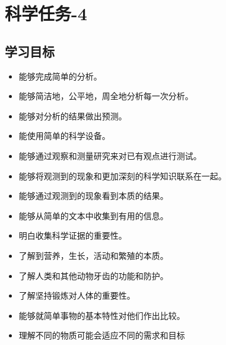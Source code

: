 \chapter{科学任务-4}


\section{学习目标}
    \begin{itemize}
      \item 能够完成简单的分析。
      \item 能够简洁地，公平地，周全地分析每一次分析。 
      \item 能够对分析的结果做出预测。
      \item 能使用简单的科学设备。
      \item 能够通过观察和测量研究来对已有观点进行测试。
      \item 能够将观测到的现象和更加深刻的科学知识联系在一起。
      \item 能够通过观测到的现象看到本质的结果。
      \item 能够从简单的文本中收集到有用的信息。
      \item 明白收集科学证据的重要性。
      \item 了解到营养，生长，活动和繁殖的本质。
      \item 了解人类和其他动物牙齿的功能和防护。
      \item 了解坚持锻炼对人体的重要性。
      \item 能够就简单事物的基本特性对他们作出比较。
      \item 理解不同的物质可能会适应不同的需求和目标
   \end{itemize}  



